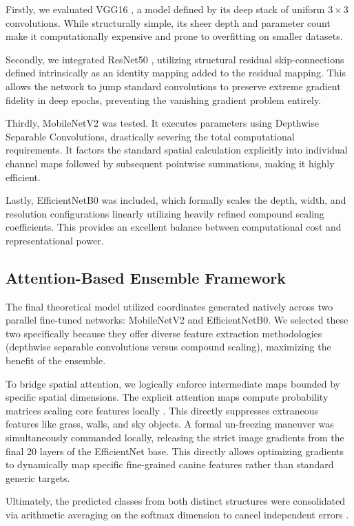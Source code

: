 \documentclass[conference]{IEEEtran}
\begin{document}
Firstly, we evaluated VGG16 \cite{b12}, a model defined by its deep stack of uniform $3 \times 3$ convolutions. While structurally simple, its sheer depth and parameter count make it computationally expensive and prone to overfitting on smaller datasets.

Secondly, we integrated ResNet50 \cite{b6}, utilizing structural residual skip-connections defined intrinsically as an identity mapping added to the residual mapping. This allows the network to jump standard convolutions to preserve extreme gradient fidelity in deep epochs, preventing the vanishing gradient problem entirely.

Thirdly, MobileNetV2 \cite{b5} was tested. It executes parameters using Depthwise Separable Convolutions, drastically severing the total computational requirements. It factors the standard spatial calculation explicitly into individual channel maps followed by subsequent pointwise summations, making it highly efficient.

Lastly, EfficientNetB0 \cite{b7} was included, which formally scales the depth, width, and resolution configurations linearly utilizing heavily refined compound scaling coefficients. This provides an excellent balance between computational cost and representational power.

\subsection{Attention-Based Ensemble Framework}
The final theoretical model utilized coordinates generated natively across two parallel fine-tuned networks: MobileNetV2 and EfficientNetB0. We selected these two specifically because they offer diverse feature extraction methodologies (depthwise separable convolutions versus compound scaling), maximizing the benefit of the ensemble.

To bridge spatial attention, we logically enforce intermediate maps bounded by specific spatial dimensions. The explicit attention maps compute probability matrices scaling core features locally \cite{b15}. This directly suppresses extraneous features like grass, walls, and sky objects. A formal un-freezing maneuver was simultaneously commanded locally, releasing the strict image gradients from the final 20 layers of the EfficientNet base. This directly allows optimizing gradients to dynamically map specific fine-grained canine features rather than standard generic targets.

Ultimately, the predicted classes from both distinct structures were consolidated via arithmetic averaging on the softmax dimension to cancel independent errors \cite{b4}. 
\end{document}
